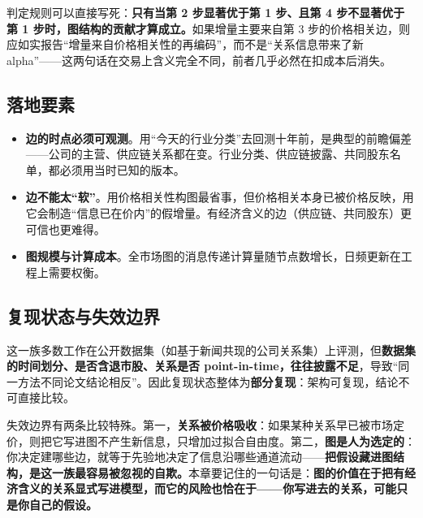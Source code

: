 判定规则可以直接写死：\textbf{只有当第 2 步显著优于第 1 步、且第 4 步不显著优于第 1 步时，图结构的贡献才算成立。}如果增量主要来自第 3 步的价格相关边，则应如实报告“增量来自价格相关性的再编码”，而不是“关系信息带来了新 alpha”——这两句话在交易上含义完全不同，前者几乎必然在扣成本后消失。

\subsection{落地要素}

\begin{itemize}
  \item \textbf{边的时点必须可观测}。用“今天的行业分类”去回测十年前，是典型的前瞻偏差——公司的主营、供应链关系都在变。行业分类、供应链披露、共同股东名单，都必须用当时已知的版本。
  \item \textbf{边不能太“软”}。用价格相关性构图最省事，但价格相关本身已被价格反映，用它会制造“信息已在价内”的假增量。有经济含义的边（供应链、共同股东）更可信也更难得。
  \item \textbf{图规模与计算成本}。全市场图的消息传递计算量随节点数增长，日频更新在工程上需要权衡。
\end{itemize}

\subsection{复现状态与失效边界}

这一族多数工作在公开数据集（如基于新闻共现的公司关系集）上评测，但\textbf{数据集的时间划分、是否含退市股、关系是否 point-in-time，往往披露不足}，导致“同一方法不同论文结论相反”。因此复现状态整体为\textbf{部分复现}：架构可复现，结论不可直接比较。

失效边界有两条比较特殊。第一，\textbf{关系被价格吸收}：如果某种关系早已被市场定价，则把它写进图不产生新信息，只增加过拟合自由度。第二，\textbf{图是人为选定的}：你决定建哪些边，就等于先验地决定了信息沿哪些通道流动——\textbf{把假设藏进图结构，是这一族最容易被忽视的自欺。}本章要记住的一句话是：\textbf{图的价值在于把有经济含义的关系显式写进模型，而它的风险也恰在于——你写进去的关系，可能只是你自己的假设。}
